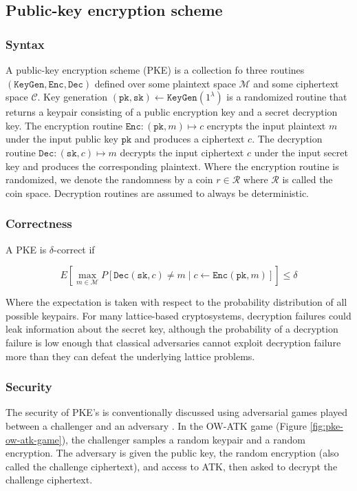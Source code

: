 \documentclass[runningheads]{llncs}
\newcommand{\keygen}{\texttt{KeyGen}}
\newcommand{\encrypt}{\texttt{Enc}}
\newcommand{\decrypt}{\texttt{Dec}}
\newcommand{\pk}{\texttt{pk}}
\newcommand{\sk}{\texttt{sk}}
\begin{document}
\subsection{Public-key encryption scheme}
\subsubsection{Syntax} A public-key encryption scheme (PKE) is a collection fo three routines $(\keygen, \encrypt, \decrypt)$ defined over some plaintext space $\mathcal{M}$ and some ciphertext space $\mathcal{C}$. Key generation $(\pk, \sk) \leftarrow \keygen(1^\lambda)$ is a randomized routine that returns a keypair consisting of a public encryption key and a secret decryption key. The encryption routine $\encrypt: (\pk, m) \mapsto c$ encrypts the input plaintext $m$ under the input public key $\pk$ and produces a ciphertext $c$. The decryption routine $\decrypt: (\sk, c) \mapsto m$ decrypts the input ciphertext $c$ under the input secret key and produces the corresponding plaintext. Where the encryption routine is randomized, we denote the randomness by a coin $r \in \mathcal{R}$ where $\mathcal{R}$ is called the coin space. Decryption routines are assumed to always be deterministic.

\subsubsection{Correctness} A PKE is $\delta$-correct if

\begin{equation*}
    E\left[\max_{m\in\mathcal{M}}
        P\left[ \decrypt(\sk, c) \neq m \mid c \leftarrow \encrypt(\pk, m)\right]
    \right] \leq \delta
\end{equation*}

Where the expectation is taken with respect to the probability distribution of all possible keypairs. For many lattice-based cryptosystems, decryption failures could leak information about the secret key, although the probability of a decryption failure is low enough that classical adversaries cannot exploit decryption failure more than they can defeat the underlying lattice problems.

\subsubsection{Security} The security of PKE's is conventionally discussed using adversarial games played between a challenger and an adversary \cite{DBLP:conf/stoc/GoldwasserM82}. In the OW-ATK game (Figure \ref{fig:pke-ow-atk-game}), the challenger samples a random keypair and a random encryption. The adversary is given the public key, the random encryption (also called the challenge ciphertext), and access to ATK, then asked to decrypt the challenge ciphertext.
\end{document}
